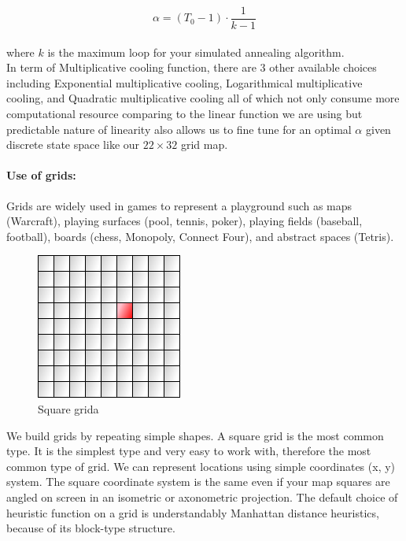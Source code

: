 \documentclass[a4paper]{article}
\begin{document}
\begin{equation}
\alpha = \left(T_0-1\right) \cdot \frac{1}{k-1}
\end{equation}
\\
\noindent where $k$ is the maximum loop for your simulated annealing algorithm. \\

\noindent In term of Multiplicative cooling function, there are 3 other available choices including Exponential multiplicative cooling, Logarithmical multiplicative cooling, and Quadratic multiplicative cooling all of which not only consume more computational resource comparing to the linear function we are using but predictable nature of linearity also allows us to fine tune for an optimal $\alpha$ given discrete state space like our $22 \times 32$ grid map.

\paragraph{Use of grids:} Grids are widely used in games to represent a playground such as maps (Warcraft), playing surfaces (pool, tennis, poker), playing fields (baseball, football), boards (chess, Monopoly, Connect Four), and abstract spaces (Tetris). \\

\begin{figure}[h!]
  \centering
    \includegraphics[scale=.6]{images/square-grid.png}
  \caption{Square grida}
\end{figure}

\noindent We build grids by repeating simple shapes. A square grid is the most common type. It is the simplest type and very easy to work with, therefore the most common type of grid. We can represent locations using simple coordinates (x, y) system. The square coordinate system is the same even if your map squares are angled on screen in an isometric or axonometric projection. The default choice of heuristic function on a grid is understandably Manhattan distance heuristics, because of its block-type structure.
\end{document}
